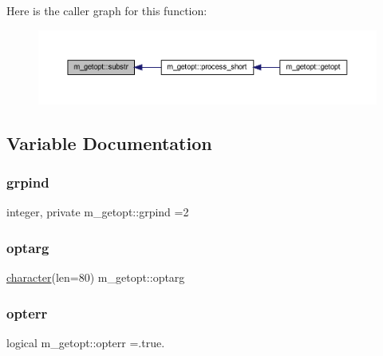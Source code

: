 Here is the caller graph for this function\+:
\nopagebreak
\begin{figure}[H]
\begin{center}
\leavevmode
\includegraphics[width=350pt]{namespacem__getopt_a20145e0f477d81541fbe9b408f2194d0_icgraph}
\end{center}
\end{figure}


\subsection{Variable Documentation}
\mbox{\label{namespacem__getopt_ae80924cbaae8d0e057ab2a0660cddee4}} 
\subsubsection{\texorpdfstring{grpind}{grpind}}
{\footnotesize\ttfamily integer, private m\+\_\+getopt\+::grpind =2\hspace{0.3cm}{\ttfamily [private]}}

\mbox{\label{namespacem__getopt_abfaa4b627673956019b3c2148e32a6fa}} 
\subsubsection{\texorpdfstring{optarg}{optarg}}
{\footnotesize\ttfamily \hyperlink{option__stopwatch_83_8txt_abd4b21fbbd175834027b5224bfe97e66}{character}(len=80) m\+\_\+getopt\+::optarg}

\mbox{\label{namespacem__getopt_a7e1bffca463ec7a33438746eea4f9cf0}} 
\subsubsection{\texorpdfstring{opterr}{opterr}}
{\footnotesize\ttfamily logical m\+\_\+getopt\+::opterr =.true.}

